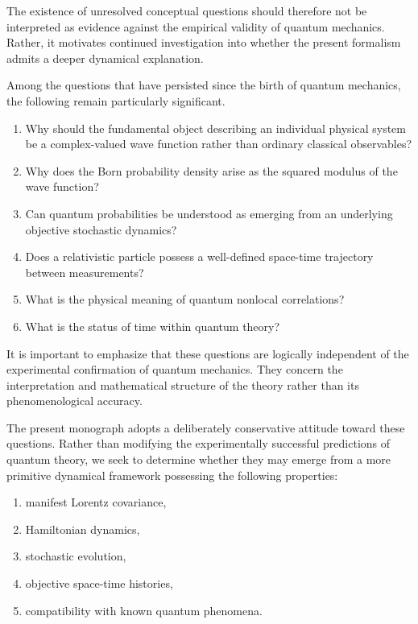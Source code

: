 The existence of unresolved conceptual questions should therefore not be
interpreted as evidence against the empirical validity of quantum mechanics.
Rather, it motivates continued investigation into whether the present
formalism admits a deeper dynamical explanation.

Among the questions that have persisted since the birth of quantum mechanics,
the following remain particularly significant.

\begin{enumerate}

\item
Why should the fundamental object describing an individual physical system be
a complex-valued wave function rather than ordinary classical observables?

\item
Why does the Born probability density arise as the squared modulus of the wave
function?

\item
Can quantum probabilities be understood as emerging from an underlying
objective stochastic dynamics?

\item
Does a relativistic particle possess a well-defined space-time trajectory
between measurements?

\item
What is the physical meaning of quantum nonlocal correlations?

\item
What is the status of time within quantum theory?

\end{enumerate}

It is important to emphasize that these questions are logically independent of
the experimental confirmation of quantum mechanics. They concern the
interpretation and mathematical structure of the theory rather than its
phenomenological accuracy.

The present monograph adopts a deliberately conservative attitude toward these
questions. Rather than modifying the experimentally successful predictions of
quantum theory, we seek to determine whether they may emerge from a more
primitive dynamical framework possessing the following properties:

\begin{enumerate}

\item manifest Lorentz covariance,

\item Hamiltonian dynamics,

\item stochastic evolution,

\item objective space-time histories,

\item compatibility with known quantum phenomena.

\end{enumerate}

